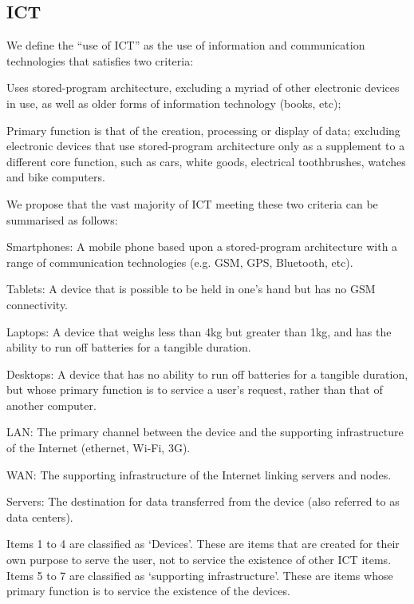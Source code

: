 \documentclass[conference]{IEEEtran}
\begin{document}
\subsection{ICT}

We define the ``use of ICT'' as the use of information and
communication technologies that satisfies two criteria:

\begin{compactitem}
\item Uses stored-program architecture, excluding a myriad of other
  electronic devices in use, as well as older forms of information
  technology (books, etc);
\item Primary function is that of the creation, processing or display
  of data; excluding electronic devices that use stored-program
  architecture only as a supplement to a different core function, such
  as cars, white goods, electrical toothbrushes, watches and bike
  computers.
\end{compactitem}

We propose that the vast majority of ICT meeting these two criteria can be
summarised as follows:

\begin{compactenum}
\item Smartphones: A mobile phone based upon a stored-program
  architecture with a range of communication technologies (e.g. GSM, GPS,
  Bluetooth, etc).
\item Tablets: A device that is possible to be held in one’s hand but
  has no GSM connectivity.
\item Laptops: A device that weighs less than 4kg but greater
  than 1kg, and has the ability to run off batteries for a
  tangible duration.
\item Desktops: A device that has no ability to run off batteries for
  a tangible duration, but whose primary function is to service a
  user’s request, rather than that of another computer.
\item LAN: The primary channel between the device and the supporting
  infrastructure of the Internet (ethernet, Wi-Fi, 3G).
\item WAN: The supporting infrastructure of the Internet linking
  servers and nodes.
\item Servers: The destination for data transferred from the device
  (also referred to as data centers).
\end{compactenum}

Items 1 to 4 are classified as `Devices'. These are items that are
created for their own purpose to serve the user, not to service the
existence of other ICT items. Items 5 to 7 are classified as
`supporting infrastructure'. These are items whose primary function is
to service the existence of the devices.
\end{document}
